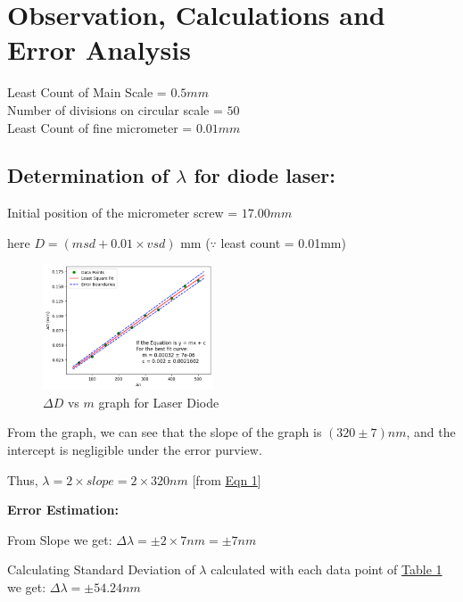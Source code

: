 \section{Observation, Calculations and Error Analysis}

    \noindent Least Count of Main Scale = $0.5 mm$\\
    Number of divisions on circular scale = $50$\\
    Least Count of fine micrometer = $0.01 mm$\\

    \subsection{Determination of $\lambda$ for diode laser:}

        Initial position of the micrometer screw = $17.00 mm$

        \noindent here $D = (msd + 0.01\times vsd)$ mm ($\because$ least count = 0.01mm)

        

		\begin{figure}[H]
			\centering
			\includegraphics[width=0.45\textwidth]{images/graph_1.png}
			\caption{$\Delta D$ vs $m$ graph for Laser Diode}
			\label{graph:1}
		\end{figure}

        From the graph, we can see that the slope of the graph is $(320\pm7)nm$, and the intercept is negligible under the error purview.

        Thus, $\lambda = 2\times slope = 2\times320 nm$ [from \hyperref[eqn:1]{Eqn 1}]
        
        \textbf{Error Estimation:} 

        From Slope we get: $\Delta\lambda = \pm2\times7nm = \pm7nm$

        Calculating Standard Deviation of $\lambda$ calculated with each data point of \hyperref[tab:1]{Table 1} we get: $\Delta\lambda = \pm54.24nm$

        \begin{center}
        \end{center}


